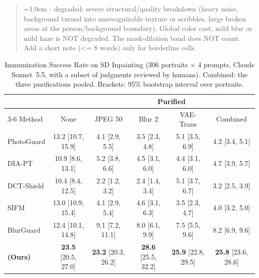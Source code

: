 \begin{quote}
\hangindent=1.0em - degraded: severe structural/quality breakdown (heavy noise, background turned into unrecognizable texture or scribbles, large broken areas at the person/background boundary). Global color cast, mild blur or mild haze is NOT degraded. The mask-dilation band does NOT count. Add a short note (<= 8 words) only for borderline cells.\par
\end{quote}

\begin{table}[t]
  \centering
  \footnotesize
  \setlength{\tabcolsep}{5pt}
  \caption{Immunization Success Rate on SD Inpainting (306 portraits $\times$ 4 prompts, Claude Sonnet~5.5, with a subset of judgments reviewed by humans). Combined: the three purifications pooled. Brackets: 95\% bootstrap interval over portraits.}
  \label{tab:supp_inpaint_isr}
  \begin{tabular}{@{}lccccc@{}}
    \toprule
    & & \multicolumn{4}{c}{Purified} \\
    \cmidrule(l){3-6}
    Method & None & JPEG 50 & Blur 2 & VAE-Trans & Combined \\
    \midrule
    PhotoGuard & 13.2 {\scriptsize[10.7, 15.9]} & 4.1 {\scriptsize[2.9, 5.5]} & 3.5 {\scriptsize[2.3, 4.8]} & 5.1 {\scriptsize[3.5, 6.9]} & 4.2 {\scriptsize[3.4, 5.1]} \\
    DIA-PT & 10.9 {\scriptsize[8.6, 13.1]} & 5.2 {\scriptsize[3.8, 6.6]} & 4.5 {\scriptsize[3.1, 6.0]} & 4.4 {\scriptsize[3.1, 6.0]} & 4.7 {\scriptsize[3.9, 5.7]} \\
    DCT-Shield & 10.4 {\scriptsize[8.4, 12.5]} & 2.2 {\scriptsize[1.2, 3.2]} & 2.4 {\scriptsize[1.4, 3.4]} & 5.1 {\scriptsize[3.7, 6.7]} & 3.2 {\scriptsize[2.5, 3.9]} \\
    SIFM & 13.0 {\scriptsize[10.9, 15.4]} & 4.1 {\scriptsize[2.9, 5.4]} & 4.6 {\scriptsize[3.1, 6.3]} & 3.5 {\scriptsize[2.3, 4.7]} & 4.0 {\scriptsize[3.2, 5.0]} \\
    BlurGuard & 12.4 {\scriptsize[10.1, 14.8]} & 9.1 {\scriptsize[7.2, 11.1]} & 8.0 {\scriptsize[6.1, 9.9]} & 7.5 {\scriptsize[5.5, 9.6]} & 8.2 {\scriptsize[6.9, 9.6]} \\
    \midrule
    \rowcolor{oursrow}
    \textbf{\capg{} (Ours)} & \textbf{23.5} {\scriptsize[20.5, 27.0]} & \textbf{23.2} {\scriptsize[20.3, 26.2]} & \textbf{28.6} {\scriptsize[25.5, 32.2]} & \textbf{25.9} {\scriptsize[22.8, 29.5]} & \textbf{25.8} {\scriptsize[23.6, 28.6]} \\
    \bottomrule
  \end{tabular}
\end{table}

